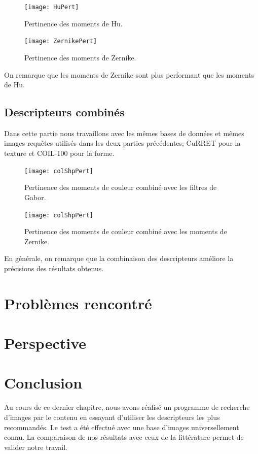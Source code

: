 \begin{figure}[H]
	\centering
	\texttt{[image: HuPert]} 
	\caption{Pertinence des moments de Hu.}
\end{figure}

\begin{figure}[H]
	\centering
	\texttt{[image: ZernikePert]} 
	\caption{Pertinence des moments de Zernike.}
\end{figure}
On remarque que les moments de Zernike sont plus performant que les moments de Hu.
\subsection{Descripteurs combinés}
Dans cette partie nous travaillons avec les mêmes bases de données et mêmes images requêtes utilisés dans les deux parties précédentes; CuRRET pour la texture et COIL-100 pour la forme.

\begin{figure}[H]
	\centering
	\texttt{[image: colShpPert]} 
	\caption{Pertinence des moments de couleur combiné avec les filtres de Gabor.}
\end{figure}

\begin{figure}[H]
	\centering
	\texttt{[image: colShpPert]} 
	\caption{Pertinence des moments de couleur combiné avec les moments de Zernike.}
\end{figure}
En générale, on remarque que la combinaison des descripteurs améliore la précisions des résultats obtenus. 
\section{Problèmes rencontré}
\section{Perspective}
\section{Conclusion}
Au cours de ce dernier chapitre, nous avons réalisé un programme de
recherche d’images par le contenu en essayant d’utiliser les descripteurs les plus recommandés. Le test a été effectué avec une base d’images
universellement connu. La comparaison de nos résultats avec ceux de la
littérature permet de valider notre travail.